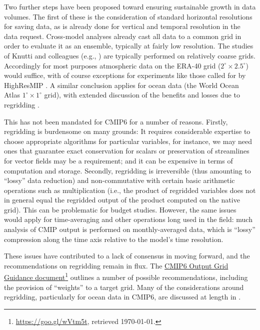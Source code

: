 \documentclass[gmd,manuscript]{copernicus}
\newcommand{\pllabel}[1]{\label{p-#1}\linelabel{l-#1}}
\newcommand{\urlref}[2] {\href{#1}{#2}\footnote{\url{#1}, retrieved \today.}}
\begin{document}
Two further steps have been proposed toward ensuring sustainable
growth in data volumes.
\pllabel{RC2-21}
The first of these is the consideration of standard horizontal
resolutions for saving data, as is already done for vertical and
temporal resolution in the data request. Cross-model analyses already
cast all data to a common grid in order to evaluate it as an ensemble,
typically at fairly low resolution. The studies of Knutti and
colleagues (e.g., \cite{ref:knuttietal2017}) are typically performed
on relatively coarse grids. Accordingly for most purposes
atmospheric data on the ERA-40 grid ($2^\circ\times 2.5^\circ$) would
suffice, with of course exceptions for experiments like those called
for by HighResMIP \citep{ref:haarsmaetal2016}. A similar
conclusion applies for ocean data (the World Ocean Atlas
$1^\circ\times 1^\circ$ grid), with extended discussion of the
benefits and losses due to regridding
\citep[see][]{ref:griffiesetal2014,ref:griffiesetal2016}.
\pllabel{RC3-14}

This has not been mandated for CMIP6 for a number of reasons. Firstly,
regridding is burdensome on many grounds: It requires considerable
expertise to choose appropriate algorithms for particular variables,
for instance, we may need ones that guarantee exact conservation for
scalars or preservation of streamlines for vector fields may be a
requirement; and it can be expensive in terms of computation and
storage. Secondly, regridding is irreversible (thus amounting to
``lossy'' data reduction) and non-commutative with certain basic
arithmetic operations such as multiplication (i.e., the product of
regridded variables does not in general equal the regridded output of
the product computed on the native grid). This can be problematic for
budget studies. However, the same issues would apply for
time-averaging and other operations long used in the field: much
analysis of CMIP output is performed on monthly-averaged data, which
is ``lossy'' compression along the time axis relative to the model's
time resolution.

These issues have contributed to a lack of consensus in moving forward,
and the recommendations on regridding remain in flux. The
\urlref{https://goo.gl/wVtm5t}{CMIP6 Output Grid Guidance document}
outlines a number of possible recommendations, including the provision
of ``weights'' to a target grid. Many of the considerations around
regridding, particularly for ocean data in CMIP6, are discussed at
length in \cite{ref:griffiesetal2016}. 
\end{document}
